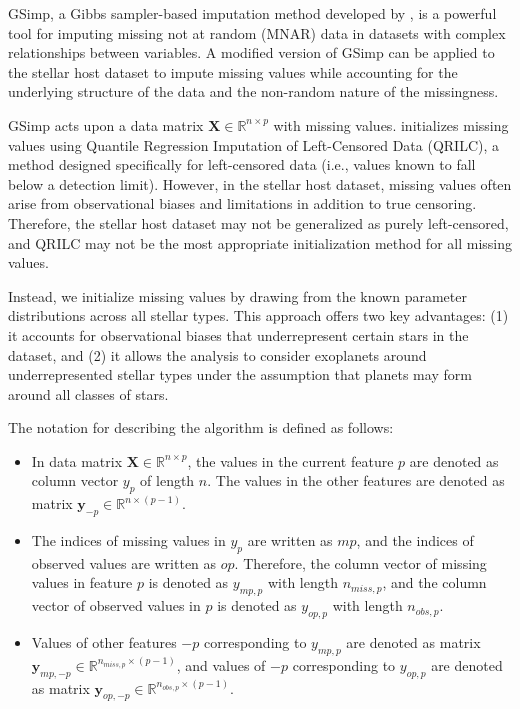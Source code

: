 \documentclass[preprint]{aastex631}
\begin{document}
GSimp, a Gibbs sampler-based imputation method developed by \citet{weiGSimpGibbsSampler2018}, is a powerful tool for imputing missing not at random (MNAR) data in datasets with complex relationships between variables. A modified version of GSimp can be applied to the stellar host dataset to impute missing values while accounting for the underlying structure of the data and the non-random nature of the missingness.

GSimp acts upon a data matrix $\mathbf{X} \in \mathbb{R}^{n \times p}$ with missing values. \citet{weiGSimpGibbsSampler2018} initializes missing values using Quantile Regression Imputation of Left-Censored Data (QRILC), a method designed specifically for left-censored data (i.e., values known to fall below a detection limit). However, in the stellar host dataset, missing values often arise from observational biases and limitations in addition to true censoring. Therefore, the stellar host dataset may not be generalized as purely left-censored, and QRILC may not be the most appropriate initialization method for all missing values.

Instead, we initialize missing values by drawing from the known parameter distributions across all stellar types. This approach offers two key advantages: (1) it accounts for observational biases that underrepresent certain stars in the dataset, and (2) it allows the analysis to consider exoplanets around underrepresented stellar types under the assumption that planets may form around all classes of stars.

The notation for describing the algorithm is defined as follows:

\begin{itemize}
  \item In data matrix $\mathbf{X} \in \mathbb{R}^{n\times p}$, the values in the current feature $p$ are denoted as column vector $y_p$ of length $n$. The values in the other features are denoted as matrix $\mathbf{y}_{-p} \in \mathbb{R}^{n \times (p-1)}$.
  \item The indices of missing values in $y_p$ are written as $mp$, and the indices of observed values are written as $op$. Therefore, the column vector of missing values in feature $p$ is denoted as $y_{mp,p}$ with length $n_{miss,p}$, and the column vector of observed values in $p$ is denoted as $y_{op,p}$ with length $n_{obs,p}$.
  \item Values of other features $-p$ corresponding to $y_{mp,p}$ are denoted as matrix $\mathbf{y}_{mp,-p} \in \mathbb{R}^{n_{miss,p} \times (p-1)}$, and values of $-p$ corresponding to $y_{op,p}$ are denoted as matrix $\mathbf{y}_{op,-p} \in \mathbb{R}^{n_{obs,p} \times (p-1)}$.
\end{itemize}
\end{document}
